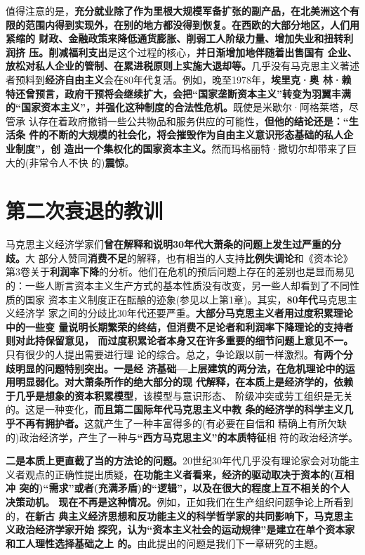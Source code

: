 值得注意的是，\textbf{充分就业除了作为里根大规模军备扩张的副产品，在北美洲这个有
  限的范围内得到实现外，在别的地方都没得到恢复。在西欧的大部分地区，人们用紧缩的
  财政、金融政策来降低通货膨胀、削弱工人阶级力量、增加失业和扭转利润挤
  压。}\textbf{削减福利支出}是这个过程的核心，\textbf{并日渐增加地伴随着出售国有
  企业、放松对私人企业的管制、在累进税原则上实施大退却等。}几乎没有马克思主义著述
者预料到\textbf{经济自由主义}会在80年代复活。例如，晚至1978年，\textbf{埃里克·奥
  林·赖特还曾预言，政府干预将会继续扩大，会把“国家垄断资本主义”转变为羽翼丰满
  的“国家资本主义”，并强化这种制度的合法性危机。}既使是米歇尔·阿格莱塔，尽管承
认存在着政府撤销一些公共物品和服务供应的可能性，\textbf{但他的结论还是：“生活条
  件的不断的大规模的社会化，将会摧毁作为自由主义意识形态基础的私人企业制度”，创
  造出一个集权化的国家资本主义。}然而玛格丽特·撒切尔却带来了巨大的(非常令人不快
的)\textbf{震惊}。

\section{第二次衰退的教训}

马克思主义经济学家们\textbf{曾在解释和说明30年代大萧条的问题上发生过严重的分歧。}大
部分人赞同\textbf{消费不足}的解释，也有相当的人支持\textbf{比例失调论}和《资本论》
第3卷关于\textbf{利润率下降}的分析。他们在危机的预后问题上存在的差别也是显而易见
的：一些人断言资本主义生产方式的基本性质没有改变，另一些人却看到了不同性质的国家
资本主义制度正在酝酿的迹象(参见以上第1章)。其实，\textbf{80年代}马克思主义经济学
家之间的分歧比30年代还要严重。\textbf{大部分马克思主义者用过度积累理论中的一些变
  量说明长期繁荣的终结，但消费不足论者和利润率下降理论的支持者则对此持保留意见，
  而过度积累论者本身又在许多重要的细节问题上意见不一。}只有很少的人提出需要进行理
论的综合。总之，争论跟以前一样激烈。\textbf{有两个分歧明显的问题特别突出。一是经
  济基础—上层建筑的两分法，在危机理论中的运用明显弱化。对大萧条所作的绝大部分的现
  代解释，在本质上是经济学的，依赖于几乎是想象的资本积累模型}，该模型与意识形态、
阶级冲突或劳工组织是无关的。这是一种变化，\textbf{而且第二国际年代马克思主义中教
  条的经济学的科学主义几乎不再有拥护者。}这就产生了一种丰富得多的(有必要在自信和
精确上有所欠缺的)政治经济学，产生了一种与\textbf{“西方马克思主义”的本质特征}相
符的政治经济学。

\textbf{二是本质上更直截了当的方法论的问题。}20世纪30年代几乎没有理论家会对功能主
义者观点的正确性提出质疑，\textbf{在功能主义者看来，经济的驱动取决于资本的(互相冲
  突的)“需求”或者(充满矛盾)的“逻辑”，以及在很大的程度上互不相关的个人决策动机。
  现在不再是这种情况。}例如，正如我们在生产组织问题争论上所看到的，\textbf{在新古
  典主义经济思想和反功能主义的科学哲学家的共同影响下，马克思主义政治经济学家开始
  探究，认为“资本主义社会的运动规律”是建立在单个资本家和工人理性选择基础之上
  的。}由此提出的问题是我们下一章研究的主题。


